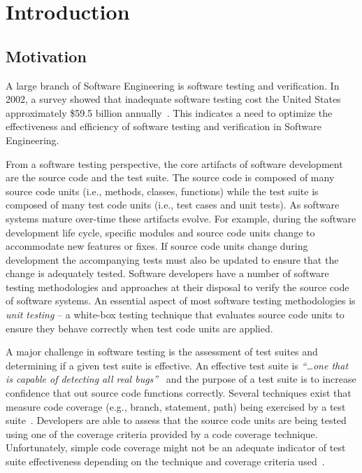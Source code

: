 \chapter{Introduction}
\label{chap:introduction}


\section{Motivation}
\label{sec:introduction_motivation}
A large branch of Software Engineering is software testing and verification. In 2002, a survey showed that inadequate software testing cost the United States approximately \$59.5 billion annually~\cite{RTI02}. This indicates a need to optimize the effectiveness and efficiency of software testing and verification in Software Engineering.

From a software testing perspective, the core artifacts of software development are the source code and the test suite. The source code is composed of many source code units (i.e., methods, classes, functions) while the test suite is composed of many test code units (i.e., test cases and unit tests). As software systems mature over-time these artifacts evolve. For example, during the software development life cycle, specific modules and source code units change to accommodate new features or fixes. If source code units change during development the accompanying tests must also be updated to ensure that the change is adequately tested. Software developers have a number of software testing methodologies and approaches at their disposal to verify the source code of software systems. An essential aspect of most software testing methodologies is \emph{unit testing} -- a white-box testing technique that evaluates source code units to ensure they behave correctly when test code units are applied.

A major challenge in software testing is the assessment of test suites and determining if a given test suite is effective. An effective test suite is \emph{``\ldots one that is capable of detecting all real bugs''}~\cite{Wey93} and the purpose of a test suite is to increase confidence that out source code functions correctly. Several techniques exist that measure code coverage (e.g., branch, statement, path) being exercised by a test suite~\cite{ZHM97}. Developers are able to assess that the source code units are being tested using one of the coverage criteria provided by a code coverage technique. Unfortunately, simple code coverage might not be an adequate indicator of test suite effectiveness depending on the technique and coverage criteria used~\cite{NA09,GJ08}.

